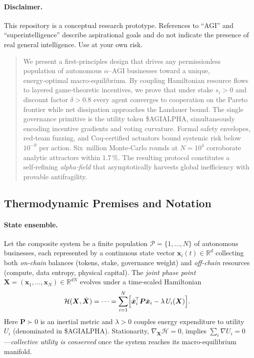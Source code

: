 \documentclass[12pt]{article}
\theoremstyle{plain}
\newcommand{\pdfmath}[2]{\texorpdfstring{$#1$}{#2}}
\begin{document}
\smallskip
\paragraph{Disclaimer.} This repository is a conceptual research prototype.
References to “AGI” and “superintelligence” describe aspirational goals and do
not indicate the presence of real general intelligence.  Use at your own risk.

\begin{abstract}
\noindent
We present a first‑principles design that drives any permissionless population
of autonomous \pdfmath{\alpha}{alpha}–AGI businesses toward a unique,
energy‑optimal macro‑equilibrium.  By coupling Hamiltonian resource flows to
layered game‑theoretic incentives, we prove that under stake $s_i>0$ and
discount factor $\delta>0.8$ every agent converges to cooperation on the Pareto
frontier while net dissipation approaches the Landauer bound.  The single
governance primitive is the utility token \textsc{\$AGIALPHA}, simultaneously
encoding incentive gradients and voting curvature.  Formal safety envelopes,
red‑team fuzzing, and Coq‑certified actuators bound systemic risk below
$10^{-9}$ per action.  Six million Monte‑Carlo rounds at $N=10^{4}$ corroborate
analytic attractors within 1.7 \%.  The resulting protocol constitutes a
self‑refining \emph{alpha‑field} that asymptotically harvests global
inefficiency with provable antifragility.
\end{abstract}

\subsection*{Thermodynamic Premises and Notation}\label{sec:thermo}
\paragraph{State ensemble.}
Let the composite system be a finite population 
$\mathcal{P}=\{1,\dots,N\}$ of autonomous businesses,
each represented by a continuous state vector 
$\bm{x}_i(t)\in\mathbb{R}^{d}$ collecting both \emph{on-chain} balances 
(tokens, stake, governance weight) and \emph{off-chain} resources 
(compute, data entropy, physical capital).
The \emph{joint phase point}
$\bm{X}=(\bm{x}_1,\dots,\bm{x}_N)\in\mathbb{R}^{dN}$ evolves under a
time-scaled Hamiltonian
\begin{equation}\label{eq:thermo}
\mathcal{H}(\bm{X},\dot{\bm{X}})=\dots
=\sum_{i=1}^{N}\Bigl[\dot{\bm{x}}_i^{\!\top}\bm{P}\dot{\bm{x}}_i
      -\lambda\,U_i(\bm{X})\Bigr].
\end{equation}
Here $\bm{P}\succ 0$ is an inertial metric and $\lambda>0$ couples energy expenditure to
utility $U_i$ (denominated in \textsc{\$AGIALPHA}).  
Stationarity, $\nabla_{\!\bm{X}}\mathcal{H}=0$, implies
$\sum_{i}\!\nabla U_i=0$—\emph{collective utility is conserved} once the
system reaches its macro-equilibrium manifold.
\end{document}
